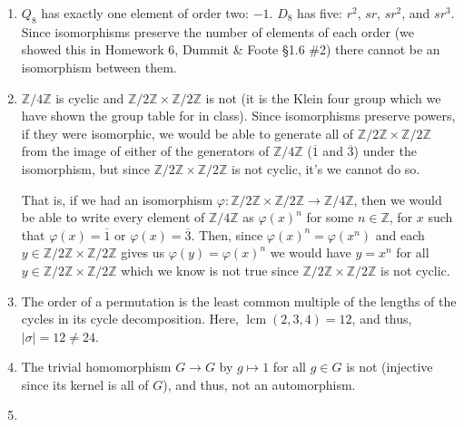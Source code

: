 \documentclass[12 pt, letterpaper]{hmcpset}
\begin{document}
\begin{solution}
	\begin{enumerate}
		\item {} 

			$Q_{8}$ has exactly one element of order two: $-1$. $D_{8}$ has five: $r^{2}$, $sr$, $sr^{2}$, and $sr^{3}$. Since isomorphisms preserve the number of elements of each order (we showed this in Homework 6, Dummit \& Foote \S1.6 \#2) there cannot be an isomorphism between them.
		\item {} 

			$\mathbb{Z}/4\mathbb{Z}$ is cyclic and $\mathbb{Z}/2\mathbb{Z} \times \mathbb{Z}/2\mathbb{Z}$ is not (it is the Klein four group which we have shown the group table for in class). Since isomorphisms preserve powers, if they were isomorphic, we would be able to generate all of $\mathbb{Z}/2\mathbb{Z} \times \mathbb{Z}/2\mathbb{Z}$ from the image of either of the generators of $\mathbb{Z}/4\mathbb{Z}$ ($\overline{1}$ and $\overline{3}$) under the isomorphism, but since $\mathbb{Z}/2\mathbb{Z} \times \mathbb{Z}/2\mathbb{Z}$ is not cyclic, it's we cannot do so. 

			That is, if we had an isomorphism $\varphi : \mathbb{Z} / 2 \mathbb{Z} \times \mathbb{Z} / 2 \mathbb{Z} \to \mathbb{Z} / 4 \mathbb{Z}$, then we would be able to write every element of $\mathbb{Z} / 4 \mathbb{Z}$ as $\varphi(x)^{n}$ for some $n \in \mathbb{Z}$, for $x$ such that $\varphi(x) = \overline{1}$ or $\varphi(x) = \overline{3}$. Then, since $\varphi(x)^{n} = \varphi(x^{n})$ and each $y \in \mathbb{Z} / 2 \mathbb{Z} \times \mathbb{Z} / 2 \mathbb{Z}$ gives us $\varphi(y) = \varphi(x)^{n}$ we would have $y = x^{n}$ for all $y \in \mathbb{Z} / 2 \mathbb{Z} \times \mathbb{Z} / 2 \mathbb{Z}$ which we know is not true since $\mathbb{Z} / 2 \mathbb{Z} \times \mathbb{Z} / 2 \mathbb{Z}$ is not cyclic.
		\item {} 

			The order of a permutation is the least common multiple of the lengths of the cycles in its cycle decomposition. Here, $\operatorname{lcm} (2, 3, 4) = 12$, and thus, $\vert \sigma \vert = 12 \neq 24$.
		\item {} 

			The trivial homomorphism $G \to G$ by $g \mapsto 1$ for all $g \in G$ is not (injective since its kernel is all of $G$), and thus, not an automorphism.
		\item {} 


\end{enumerate}
\end{solution}
\end{document}
